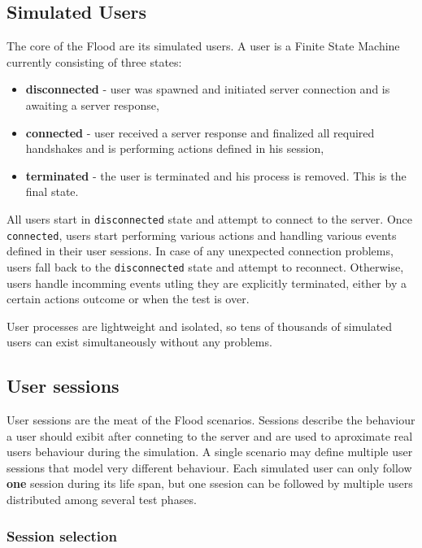 \documentclass[a4paper]{article}
\begin{document}
\subsection{Simulated Users}
\label{sec-2-1}

The core of the Flood are its simulated users. A user is a Finite State Machine currently consisting of three states:


\begin{itemize}
\item \textbf{disconnected} - user was spawned and initiated server connection and is awaiting a server response,
\item \textbf{connected} - user received a server response and finalized all required handshakes and is performing actions defined in his session,
\item \textbf{terminated} - the user is terminated and his process is removed. This is the final state.
\end{itemize}

\noindent
All users start in \texttt{disconnected} state and attempt to connect to the server. Once \texttt{connected}, users start performing various actions and handling various events defined in their user sessions. In case of any unexpected connection problems, users fall back to the \texttt{disconnected} state and attempt to reconnect. Otherwise, users handle incomming events utling they are explicitly terminated, either by a certain actions outcome or when the test is over.

\noindent
User processes are lightweight and isolated, so tens of thousands of simulated users can exist simultaneously without any problems.
\subsection{User sessions}
\label{sec-2-2}
\label{ref-sessions}

User sessions are the meat of the Flood scenarios. Sessions describe the behaviour a user should exibit after conneting to the server and are used to aproximate real users behaviour during the simulation. A single scenario may define multiple user sessions that model very different behaviour. Each simulated user can only follow \textbf{one} session during its life span, but one ssesion can be followed by multiple users distributed among several test phases.
\subsubsection{Session selection}
\label{sec-2-2-1}
\end{document}
